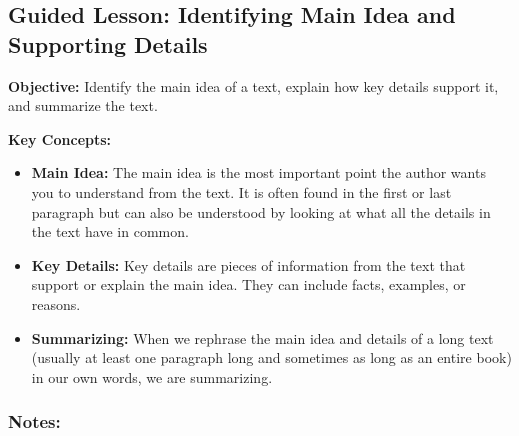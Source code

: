 \documentclass[12pt]{article}
\title{}
\date{}
\begin{document}
\subsection*{Guided Lesson: Identifying Main Idea and Supporting Details}
\onehalfspacing

\begin{tcolorbox}[colframe=black!40, colback=gray!5, 
coltitle=black, colbacktitle=black!20, fonttitle=\bfseries\Large, 
title=Learning Objective, halign title=center, left=5pt, right=5pt, top=5pt, bottom=15pt]
\textbf{Objective:} Identify the main idea of a text, explain how key details support it, and summarize the text.
\end{tcolorbox}


\vspace{1em}

\begin{tcolorbox}[colframe=black!60, colback=white, 
coltitle=black, colbacktitle=black!15, fonttitle=\bfseries\Large, 
title=Key Concepts and Vocabulary, halign title=center, left=10pt, right=10pt, top=10pt, bottom=15pt]
\textbf{Key Concepts:}
\begin{itemize}
    \item \textbf{Main Idea:} The main idea is the most important point the author wants you to understand from the text. It is often found in the first or last paragraph but can also be understood by looking at what all the details in the text have in common.
    \item \textbf{Key Details:} Key details are pieces of information from the text that support or explain the main idea. They can include facts, examples, or reasons.
    \item \textbf{Summarizing:} When we rephrase the main idea and details of a long text (usually at least one paragraph long and sometimes as long as an entire book) in our own words, we are summarizing.
\end{itemize}

\end{tcolorbox}

\vspace{1em}

\subsubsection*{Notes:}
\noindent \underline{\hspace{17cm}} \\[1.2cm]
\noindent \underline{\hspace{17cm}} \\[1.2cm]
\noindent \underline{\hspace{17cm}} \\[1.2cm]
\end{document}
